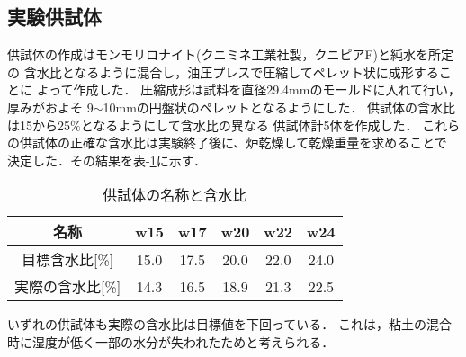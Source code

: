 \documentclass{jsce}
\begin{document}
\subsection{実験供試体}
供試体の作成はモンモリロナイト(クニミネ工業社製，クニピアF)と純水を所定の
含水比となるように混合し，油圧プレスで圧縮してペレット状に成形することに
よって作成した．
圧縮成形は試料を直径29.4mmのモールドに入れて行い，厚みがおよそ
9$\sim$10mmの円盤状のペレットとなるようにした．
供試体の含水比は15から25$\%$となるようにして含水比の異なる
供試体計5体を作成した．
これらの供試体の正確な含水比は実験終了後に、炉乾燥して乾燥重量を求めることで
決定した．その結果を表-\ref{tbl:samples}に示す．
\begin{table}[h]
\begin{center}
\caption{供試体の名称と含水比}
	\label{tbl:samples}
\begin{tabular}{c||c|c|c|c|c}
\hline
	名称 & w15 & w17 & w20 & w22 & w24 \\
\hline
\hline
	目標含水比[\%] & 15.0 & 17.5 & 20.0 & 22.0 & 24.0 \\
\hline
	実際の含水比[\%] &  14.3 & 16.5 & 18.9 & 21.3 & 22.5  \\
\hline 
\end{tabular}
\end{center}
\end{table}
いずれの供試体も実際の含水比は目標値を下回っている．
これは，粘土の混合時に湿度が低く一部の水分が失われたためと考えられる．
\end{document}
